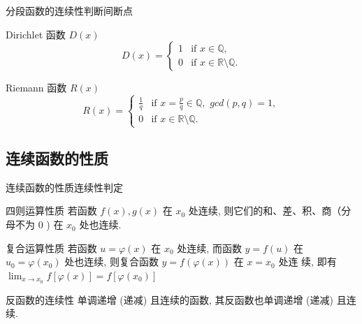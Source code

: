 \documentclass[
10pt,
aspectratio=43,
]{beamer}
\begin{document}
				\begin{frame}{分段函数的连续性}{判断间断点}
					\begin{exampleblock}{Dirichlet 函数 $D(x)$}
						\[
							D(x) = \begin{cases}
							1 & \text{if } x \in \mathbb{Q}, \\
							0 & \text{if } x \in \mathbb{R} \setminus \mathbb{Q}.
							\end{cases}
						\]
						
					\end{exampleblock}
					\pause
					\begin{exampleblock}{Riemann 函数 $R(x)$}
						\[
							R(x) = \begin{cases}
							\displaystyle\frac1q & \text{if } x = \displaystyle\frac{p}{q}\in \mathbb{Q},\,\,gcd(p,q)=1, \\
							0 & \text{if } x \in \mathbb{R} \setminus \mathbb{Q}.
							\end{cases}
						\]
						
					\end{exampleblock}
					
				\end{frame}
				
				
					
				
				
				\subsection{连续函数的性质}
				
				\begin{frame}{连续函数的性质}{连续性判定}
					\begin{exampleblock}{四则运算性质}
						若函数 $f(x), g(x)$ 在 $x_0$ 处连续, 则它们的和、差、积、商（分 母不为 0 ) 在 $x_0$ 处也连续.
					\end{exampleblock}
					\pause
					\begin{exampleblock}{复合运算性质}
						若函数 $u=\varphi(x)$ 在 $x_0$ 处连续, 而函数 $y=f(u)$ 在 $u_0=\varphi\left(x_0\right)$ 处也连续, 则复合函数 $y=f(\varphi(x))$ 在 $x=x_0$ 处连 续, 即有 $\lim _{x \rightarrow x_0} f[\varphi(x)]=f\left[\varphi\left(x_0\right)\right]$
							
					\end{exampleblock}
					\pause
					\begin{exampleblock}{反函数的连续性}
						单调递增 (递减) 且连续的函数, 其反函数也单调递增 (递减) 且连续.
					\end{exampleblock}
						
				\end{frame}
				
\end{document}
